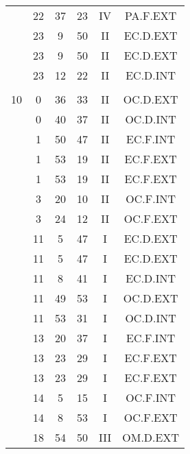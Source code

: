 \documentclass[12pt, a4paper]{article}
\begin{document}
\begin{multicols}{3}
{\begin{tabular}{c c c c c c}
	 	 	 	 & 22 & 37 & 23 & IV & PA.F.EXT\\%
	 	 	 	 & 23 & 9 & 50 & II & EC.D.EXT\\%
	 	 	 	 & 23 & 9 & 50 & II & EC.D.EXT\\%
	 	 	 	 & 23 & 12 & 22 & II & EC.D.INT\\%
	 	 	 	 & & & & & \\%
	 	 	 	10 & 0 & 36 & 33 & II & OC.D.EXT\\%
	 	 	 	 & 0 & 40 & 37 & II & OC.D.INT\\%
	 	 	 	 & 1 & 50 & 47 & II & EC.F.INT\\%
	 	 	 	 & 1 & 53 & 19 & II & EC.F.EXT\\%
	 	 	 	 & 1 & 53 & 19 & II & EC.F.EXT\\%
	 	 	 	 & 3 & 20 & 10 & II & OC.F.INT\\%
	 	 	 	 & 3 & 24 & 12 & II & OC.F.EXT\\%
	 	 	 	 & 11 & 5 & 47 & I & EC.D.EXT\\%
	 	 	 	 & 11 & 5 & 47 & I & EC.D.EXT\\%
	 	 	 	 & 11 & 8 & 41 & I & EC.D.INT\\%
	 	 	 	 & 11 & 49 & 53 & I & OC.D.EXT\\%
	 	 	 	 & 11 & 53 & 31 & I & OC.D.INT\\%
	 	 	 	 & 13 & 20 & 37 & I & EC.F.INT\\%
	 	 	 	 & 13 & 23 & 29 & I & EC.F.EXT\\%
	 	 	 	 & 13 & 23 & 29 & I & EC.F.EXT\\%
	 	 	 	 & 14 & 5 & 15 & I & OC.F.INT\\%
	 	 	 	 & 14 & 8 & 53 & I & OC.F.EXT\\%
	 	 	 	 & 18 & 54 & 50 & III & OM.D.EXT\\%

\end{tabular}}
\end{multicols}
\end{document}
